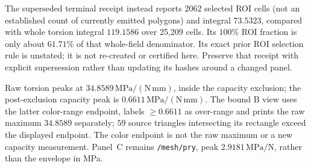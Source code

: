 The superseded terminal receipt instead reports 2062 selected ROI cells (not an established count of currently emitted polygons) and integral $73.5323$, compared with whole torsion integral $119.1586$ over 25,209 cells. Its $100\%$ ROI fraction is only about $61.71\%$ of that whole-field denominator. Its exact prior ROI selection rule is unstated; it is not re-created or certified here. Preserve that receipt with explicit supersession rather than updating its hashes around a changed panel.

Raw torsion peaks at $34.8589\,\mathrm{MPa/(N\,mm)}$, inside the capacity exclusion; the post-exclusion capacity peak is $0.6611\,\mathrm{MPa/(N\,mm)}$. The bound B view uses the latter color-range endpoint, labels $\ge0.6611$ as over-range and prints the raw maximum $34.8589$ separately; $59$ source triangles intersecting its rectangle exceed the displayed endpoint. The color endpoint is not the raw maximum or a new capacity measurement. Panel~C remains \nolinkurl{/mesh/pry}, peak $2.9181\,\mathrm{MPa/N}$, rather than the envelope in MPa.
